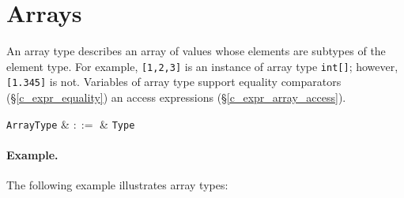 %
%
%
% 
%


\section{Arrays}
\label{c_types_array}

An array type describes an array of values whose elements are subtypes of the element type. For example, \lstinline{[1,2,3]} is an instance of array type \lstinline{int[]}; however, \lstinline{[1.345]} is not.  Variables of array type support equality comparators (\S\ref{c_expr_equality}) an access expressions (\S\ref{c_expr_array_access}).

\begin{syntax}
  \verb+ArrayType+ & $::=$ & \verb+Type+ \ \token{[}\ \token{]}\\
\end{syntax}

\paragraph{Example.} The following example illustrates array types:

